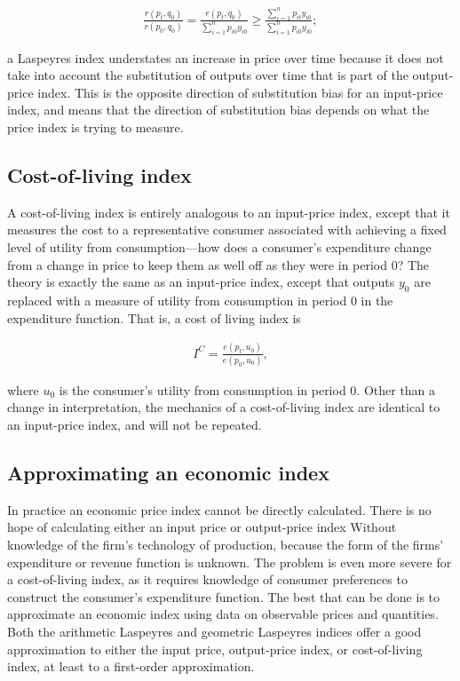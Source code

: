 \documentclass[]{article}
\begin{document}
\begin{align*}
\frac{r(p_{t}, q_{0})}{r(p_{0}, q_{0})} = \frac{r(p_{t}, q_{0})}{\sum_{i = 1}^{n} p_{i0} y_{i0}} \geq \frac{\sum_{i = 1}^{n} p_{it} y_{i0}}{\sum_{i = 1}^{n} p_{i0} y_{i0}};
\end{align*}

a Laspeyres index understates an increase in price over time because it does not take into account the substitution of outputs over time that is part of the output-price index. This is the opposite direction of substitution bias for an input-price index, and means that the direction of substitution bias depends on what the price index is trying to measure.

\hypertarget{cost-of-living-index}{%
\subsection{Cost-of-living index}\label{cost-of-living-index}}

A cost-of-living index is entirely analogous to an input-price index, except that it measures the cost to a representative consumer associated with achieving a fixed level of utility from consumption---how does a consumer's expenditure change from a change in price to keep them as well off as they were in period 0? The theory is exactly the same as an input-price index, except that outputs \(y_0\) are replaced with a measure of utility from consumption in period 0 in the expenditure function. That is, a cost of living index is

\begin{align*}
I^{C} = \frac{e(p_{t}, u_{0})}{e(p_{0}, u_{0})},
\end{align*}

where \(u_{0}\) is the consumer's utility from consumption in period 0. Other than a change in interpretation, the mechanics of a cost-of-living index are identical to an input-price index, and will not be repeated.

\hypertarget{approximating-an-economic-index}{%
\subsection{Approximating an economic index}\label{approximating-an-economic-index}}

In practice an economic price index cannot be directly calculated. There is no hope of calculating either an input price or output-price index Without knowledge of the firm's technology of production, because the form of the firms' expenditure or revenue function is unknown. The problem is even more severe for a cost-of-living index, as it requires knowledge of consumer preferences to construct the consumer's expenditure function. The best that can be done is to approximate an economic index using data on observable prices and quantities. Both the arithmetic Laspeyres and geometric Laspeyres indices offer a good approximation to either the input price, output-price index, or cost-of-living index, at least to a first-order approximation.
\end{document}
